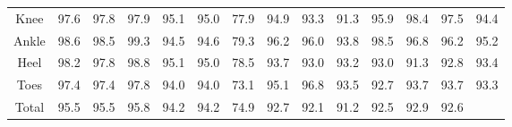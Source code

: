 \documentclass{beamer}
\begin{document}
\begin{frame}
\begin{table}[htbp]
{\begin{adjustbox}{center}
\begin{tabular}{c||ccc|ccc|ccc|ccc|c}
                    Knee & 97.6 & 97.8 & 97.9 & 95.1 & 95.0 & 77.9 & 94.9 & 93.3 & 91.3 & 95.9 & 98.4 & 97.5 & 94.4 \\
                    Ankle & 98.6 & 98.5 & 99.3 & 94.5 & 94.6 & 79.3 & 96.2 & 96.0 & 93.8 & 98.5 & 96.8 & 96.2 & 95.2 \\
                    Heel & 98.2 & 97.8 & 98.8 & 95.1 & 95.0 & 78.5 & 93.7 & 93.0 & 93.2 & 93.0 & 91.3 & 92.8 & 93.4 \\
                    Toes & 97.4 & 97.4 & 97.8 & 94.0 & 94.0 & 73.1 & 95.1 & 96.8 & 93.5 & 92.7 & 93.7 & 93.7 & 93.3 \\
                    \hline
                    Total & 95.5 & 95.5 & 95.8 & 94.2 & 94.2 & 74.9 & 92.7 & 92.1 & 91.2 & 92.5 & 92.9 & 92.6 & \\
                    \hline
                \end{tabular}
            \end{adjustbox}
        }
    \end{table}
\end{frame}
\end{document}
